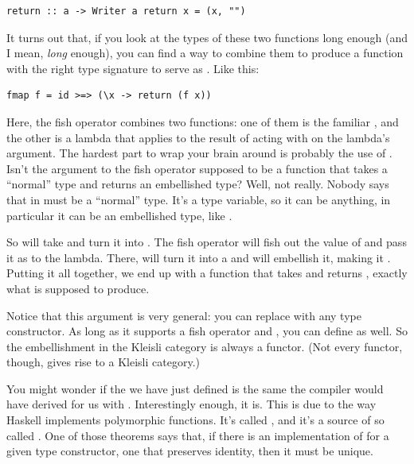 \begin{Verbatim}
return :: a -> Writer a return x = (x, "")
\end{Verbatim}
It turns out that, if you look at the types of these two functions long
enough (and I mean, \emph{long} enough), you can find a way to combine
them to produce a function with the right type signature to serve as
. Like this:

\begin{Verbatim}
fmap f = id >=> (\x -> return (f x))
\end{Verbatim}
Here, the fish operator combines two functions: one of them is the
familiar , and the other is a lambda that applies
 to the result of acting with  on the lambda's
argument. The hardest part to wrap your brain around is probably the use
of . Isn't the argument to the fish operator supposed to be a
function that takes a ``normal'' type and returns an embellished type?
Well, not really. Nobody says that  in
 must be a ``normal'' type. It's a
type variable, so it can be anything, in particular it can be an
embellished type, like .

So  will take  and turn it into
. The fish operator will fish out the value of
 and pass it as  to the lambda. There, 
will turn it into a  and  will embellish it,
making it . Putting it all together, we end up with a
function that takes  and returns ,
exactly what  is supposed to produce.

Notice that this argument is very general: you can replace
 with any type constructor. As long as it supports a fish
operator and , you can define  as well. So
the embellishment in the Kleisli category is always a functor. (Not
every functor, though, gives rise to a Kleisli category.)

You might wonder if the  we have just defined is the same
 the compiler would have derived for us with
. Interestingly enough, it is. This is due to
the way Haskell implements polymorphic functions. It's called
, and it's a source of so called
. One of those theorems says that, if there is
an implementation of  for a given type constructor, one
that preserves identity, then it must be unique.

